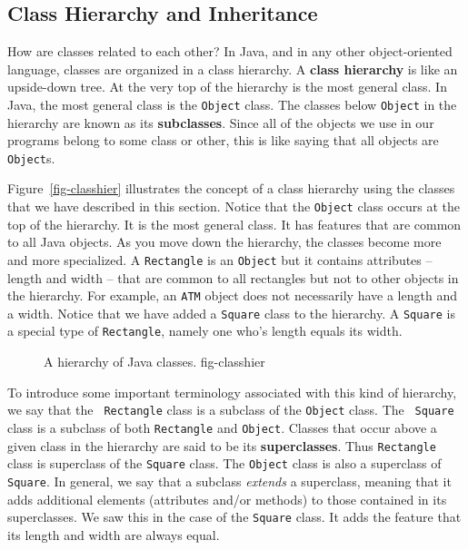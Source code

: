 \subsection{Class Hierarchy and Inheritance}

How are classes related to each other?  In Java, and in any other
object-oriented language, classes are organized in a class hierarchy.
A {\bf class hierarchy} is like an upside-down tree. At the very top
of the hierarchy is the most general class. In Java, the most general
class is the {\tt Object} class.  The classes below {\tt Object} in
the hierarchy are known as its {\bf subclasses}.  Since all of the
objects we use in our programs belong to some class or other, this is
like saying that all objects are {\tt Object}s.

Figure~\ref{fig-classhier} illustrates the concept of a class hierarchy
using the classes that we have described in this section.  Notice that
the {\tt Object} class occurs at the top of the hierarchy.  It is the
most general class. It has features that are common to all Java
objects. As you move down the hierarchy, the classes become more and
more specialized. A {\tt Rectangle} is an {\tt Object} but it contains
attributes -- length and width -- that are common to all rectangles
but not to other objects in the hierarchy. For example, an {\tt ATM}
object does not necessarily have a length and a width. Notice that
we have added a {\tt Square} class to the hierarchy. A {\tt Square}
is a special type of {\tt Rectangle}, namely one who's length equals
its width.

\begin{figure}[tb]
{A hierarchy of Java classes.}
{fig-classhier}

\end{figure}

To introduce some important terminology associated with this kind of
 hierarchy, we say that the {\tt
Rectangle} class is a subclass of the {\tt Object} class. The {\tt
Square} class is a subclass of both {\tt Rectangle} and {\tt Object}.
Classes that occur above a given class in the hierarchy are said to be
its {\bf superclasses}. Thus {\tt Rectangle} class is superclass of
the {\tt Square} class. The {\tt Object} class is also a superclass of
{\tt Square}.  In general, we say that a subclass {\em extends} a
superclass, meaning that it adds additional elements (attributes
and/or methods) to those contained in its superclasses. We saw this in
the case of the {\tt Square} class. It adds the feature that its
length and width are always equal.

